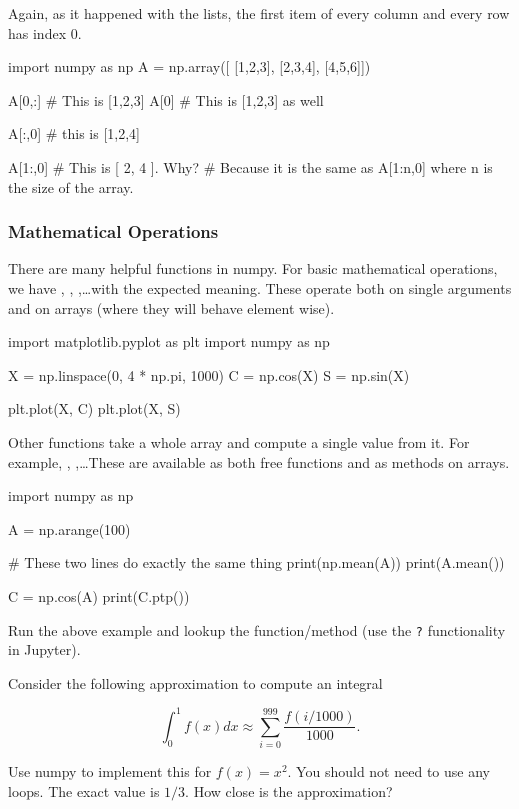 \noindent Again, as it happened with the lists, the first item of every column and every row has index 0.

\begin{python}
import numpy as np
A = np.array([
    [1,2,3],
    [2,3,4],
    [4,5,6]])

A[0,:] # This is [1,2,3]
A[0] # This is [1,2,3] as well

A[:,0] # this is [1,2,4]

A[1:,0] # This is [ 2, 4 ]. Why?
        # Because it is the same as A[1:n,0] where n is the size of the array.
\end{python}

\subsubsection{Mathematical Operations}

There are many helpful functions in numpy. For basic mathematical operations, we have , , ,\ldots with the expected meaning. These operate both on single arguments and on arrays (where they will behave element wise).

\begin{python}
import matplotlib.pyplot as plt
import numpy as np

X = np.linspace(0, 4 * np.pi, 1000)
C = np.cos(X)
S = np.sin(X)

plt.plot(X, C)
plt.plot(X, S)
\end{python}

Other functions take a whole array and compute a single value from it. For example, , ,\ldots These are available as both free functions and as methods on arrays.

\begin{python}
import numpy as np

A = np.arange(100)

# These two lines do exactly the same thing
print(np.mean(A))
print(A.mean())

C = np.cos(A)
print(C.ptp())
\end{python}

\begin{exercise}
Run the above example and lookup the  function/method (use the \texttt{?} functionality in Jupyter).
\end{exercise}


\begin{exercise}
Consider the following approximation to compute an integral

\[
\int_0^{1} f(x)dx \approx \sum_{i = 0}^{999} \frac{f(i/1000)}{1000}.
\]

Use numpy to implement this for $f(x) = x^2$. You should not need to use any loops. The exact value is $1/3$. How close is the approximation?
\end{exercise}
